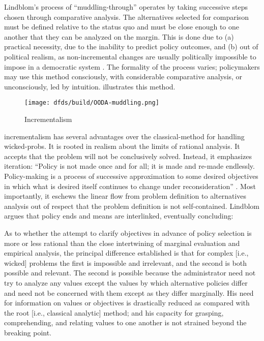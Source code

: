 Lindblom's process of ``\ac{muddling-through}'' operates by taking successive steps chosen through comparative analysis.
The alternatives selected for comparison must be defined relative to the status quo and must be close enough to one
another that they can be analyzed on the margin. This is done due to (a) practical necessity, due to the inability to
predict policy outcomes, and (b) out of political realism, as non-incremental changes are usually politically impossible
to impose in a democratic system \cite{lindblom_muddling_1959}. The formality of the process varies; policymakers may
use this method consciously, with considerable comparative analysis, or unconsciously, led by intuition.
 illustrates this method.


\begin{figure}[h]
  \centering\CaptionFontSize
  \texttt{[image: dfds/build/OODA-muddling.png]}
  \caption{Incrementalism}
  \label{fig-muddling-through}
\end{figure}

\Ac{incrementalism} has several advantages over the \ac{classical-method} for handling \acp{wicked-prob}. It is rooted
in realism about the limits of rational analysis. It accepts that the problem will not be conclusively solved. Instead,
it emphasizes iteration: ``Policy is not made once and for all; it is made and re-made endlessly. Policy-making is a
process of successive approximation to some desired objectives in which what is desired itself continues to change under
reconsideration'' \cite{lindblom_muddling_1959}. Most importantly, it eschews the linear flow from problem definition to
alternatives analysis out of respect that the problem definition is not self-contained. Lindblom argues that policy ends
and means are interlinked, eventually concluding:

\begin{displayquote}
As to whether the attempt to clarify objectives in advance of policy selection is more or less rational than the close
intertwining of marginal evaluation and empirical analysis, the principal difference established is that for complex
[i.e., wicked] problems the first is impossible and irrelevant, and the second is both possible and relevant. The second
is possible because the administrator need not try to analyze any values except the values by which alternative policies
differ and need not be concerned with them except as they differ marginally. His need for information on values or
objectives is drastically reduced as compared with the root [i.e., classical analytic] method; and his capacity for
grasping, comprehending, and relating values to one another is not strained beyond the breaking point.
\cite{lindblom_muddling_1959}
\end{displayquote}

